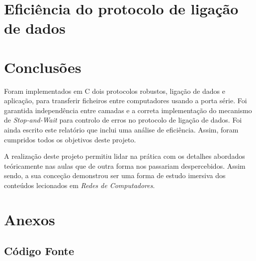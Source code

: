 \documentclass[a4paper,11pt,portuguese]{article}
\begin{document}
\section{Eficiência do protocolo de ligação de dados}



\section{Conclusões}

    Foram implementados em C dois protocolos robustos, ligação de dados e aplicação, para
    transferir ficheiros entre computadores usando a porta série. Foi garantida
    independência entre camadas e a correta implementação do mecanismo de
    \textit{Stop-and-Wait} para controlo de erros no protocolo de ligação
    de dados. Foi ainda escrito este relatório que inclui uma análise de eficiência.
    Assim, foram cumpridos todos os objetivos deste projeto. \par

    A realização deste projeto permitiu lidar na prática com os detalhes abordados
    teóricamente nas aulas que de outra forma nos passariam despercebidos. Assim sendo,
    a sua conceção demonstrou ser uma forma de estudo imersiva dos conteúdos lecionados
    em \textit{Redes de Computadores}.


\newpage

\section{Anexos}
\subsection{Código Fonte}












\end{document}
